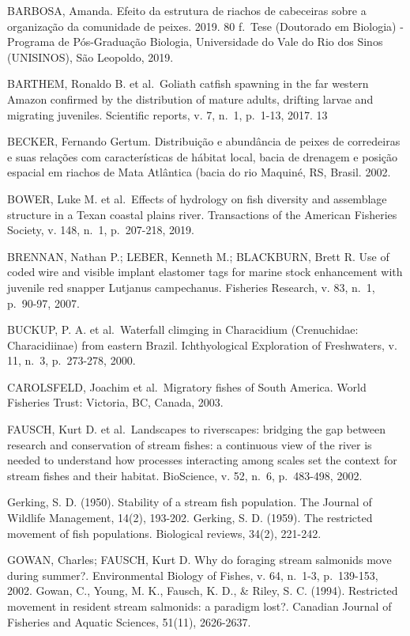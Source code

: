 \documentclass[
]{article}
\begin{document}
BARBOSA, Amanda. Efeito da estrutura de riachos de cabeceiras sobre a
organização da comunidade de peixes. 2019. 80 f.~Tese (Doutorado em
Biologia) - Programa de Pós-Graduação Biologia, Universidade do Vale do
Rio dos Sinos (UNISINOS), São Leopoldo, 2019.

BARTHEM, Ronaldo B. et al.~Goliath catfish spawning in the far western
Amazon confirmed by the distribution of mature adults, drifting larvae
and migrating juveniles. Scientific reports, v. 7, n.~1, p.~1-13, 2017.
13

BECKER, Fernando Gertum. Distribuição e abundância de peixes de
corredeiras e suas relações com características de hábitat local, bacia
de drenagem e posição espacial em riachos de Mata Atlântica (bacia do
rio Maquiné, RS, Brasil. 2002.

BOWER, Luke M. et al.~Effects of hydrology on fish diversity and
assemblage structure in a Texan coastal plains river. Transactions of
the American Fisheries Society, v. 148, n.~1, p.~207-218, 2019.

BRENNAN, Nathan P.; LEBER, Kenneth M.; BLACKBURN, Brett R. Use of
codedwire and visible implant elastomer tags for marine stock
enhancement with juvenile red snapper Lutjanus campechanus. Fisheries
Research, v. 83, n.~1, p.~90-97, 2007.

BUCKUP, P. A. et al.~Waterfall climging in Characidium (Crenuchidae:
Characidiinae) from eastern Brazil. Ichthyological Exploration of
Freshwaters, v. 11, n.~3, p.~273-278, 2000.

CAROLSFELD, Joachim et al.~Migratory fishes of South America. World
Fisheries Trust: Victoria, BC, Canada, 2003.

FAUSCH, Kurt D. et al.~Landscapes to riverscapes: bridging the gap
between research and conservation of stream fishes: a continuous view of
the river is needed to understand how processes interacting among scales
set the context for stream fishes and their habitat. BioScience, v. 52,
n.~6, p.~483-498, 2002.

Gerking, S. D. (1950). Stability of a stream fish population. The
Journal of Wildlife Management, 14(2), 193-202. Gerking, S. D. (1959).
The restricted movement of fish populations. Biological reviews, 34(2),
221-242.

GOWAN, Charles; FAUSCH, Kurt D. Why do foraging stream salmonids move
during summer?. Environmental Biology of Fishes, v. 64, n.~1-3,
p.~139-153, 2002. Gowan, C., Young, M. K., Fausch, K. D., \& Riley, S.
C. (1994). Restricted movement in resident stream salmonids: a paradigm
lost?. Canadian Journal of Fisheries and Aquatic Sciences, 51(11),
2626-2637.
\end{document}
